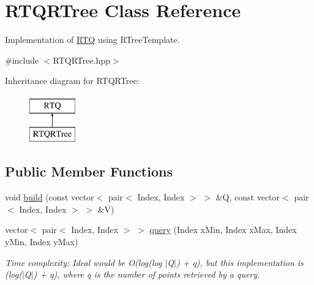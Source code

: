\hypertarget{class_r_t_q_r_tree}{\section{\-R\-T\-Q\-R\-Tree \-Class \-Reference}
\label{class_r_t_q_r_tree}
}


\-Implementation of \hyperlink{class_r_t_q}{\-R\-T\-Q} using \-R\-Tree\-Template.  




{\ttfamily \#include $<$\-R\-T\-Q\-R\-Tree.\-hpp$>$}

\-Inheritance diagram for \-R\-T\-Q\-R\-Tree\-:\begin{figure}[H]
\begin{center}
\leavevmode
\includegraphics[height=2.000000cm]{class_r_t_q_r_tree}
\end{center}
\end{figure}
\subsection*{\-Public \-Member \-Functions}
\begin{DoxyCompactItemize}
\item 
\hypertarget{class_r_t_q_r_tree_a5ad156987c9c875f0c87d2030989847d}{void \hyperlink{class_r_t_q_r_tree_a5ad156987c9c875f0c87d2030989847d}{build} (const vector$<$ pair$<$ \-Index, \-Index $>$ $>$ \&\-Q, const vector$<$ pair$<$ \-Index, \-Index $>$ $>$ \&\-V)}\label{class_r_t_q_r_tree_a5ad156987c9c875f0c87d2030989847d}

\begin{DoxyCompactList}\small\item\em \end{DoxyCompactList}\item 
\hypertarget{class_r_t_q_r_tree_a00f5a820e471e70c911c3402ac270ea5}{vector$<$ pair$<$ \-Index, \-Index $>$ $>$ \hyperlink{class_r_t_q_r_tree_a00f5a820e471e70c911c3402ac270ea5}{query} (\-Index x\-Min, \-Index x\-Max, \-Index y\-Min, \-Index y\-Max)}\label{class_r_t_q_r_tree_a00f5a820e471e70c911c3402ac270ea5}

\begin{DoxyCompactList}\small\item\em \-Time complexity\-: \-Ideal would be \-O(log(log $|$\-Q$|$) + q), but this implementation is (log($|$\-Q$|$) + q), where q is the number of points retrieved by a query. \end{DoxyCompactList}\end{DoxyCompactItemize}


